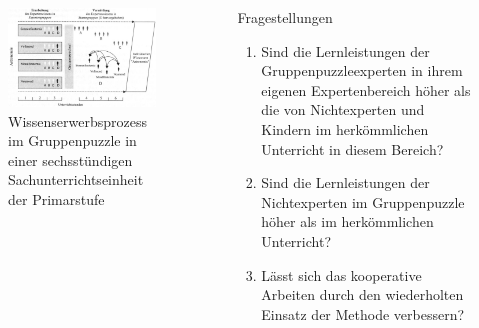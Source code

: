 \documentclass[final]{beamer}
\newlength{\sepwid}
\newlength{\onecolwid}
\newlength{\twocolwid}
\begin{document}
\begin{frame}[t]
\begin{columns}[t]
\begin{column}{\onecolwid}
\begin{figure}
\includegraphics[width=1.0\linewidth]{experteneffekt.jpg}
\caption{Wissenserwerbsprozess im Gruppenpuzzle in einer sechsstündigen Sachunterrichtseinheit der Primarstufe}
\end{figure}


\end{column} %
\begin{column}{\sepwid}\end{column} %


\begin{column}{\twocolwid} %



\begin{block}{Fragestellungen}
\begin{enumerate}
\item Sind die Lernleistungen der Gruppenpuzzleexperten in ihrem eigenen Expertenbereich höher als die von Nichtexperten und Kindern im herkömmlichen Unterricht in diesem Bereich?
\item Sind die Lernleistungen der Nichtexperten im Gruppenpuzzle höher als im herkömmlichen Unterricht?
\item Lässt sich das kooperative Arbeiten durch den wiederholten Einsatz der Methode verbessern?
\end{enumerate}
\end{block}



\end{column}
\end{columns}
\end{frame}
\end{document}
